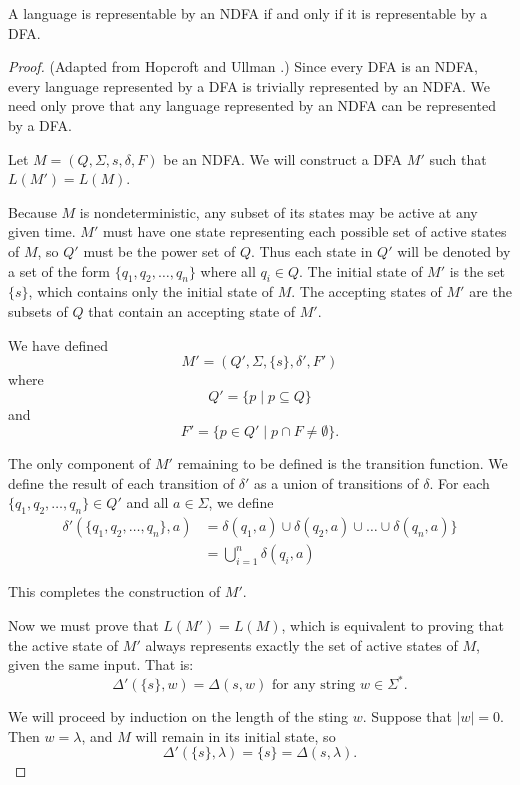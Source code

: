 \documentclass{bcthesis}
\newcommand{\footcite}[2]{\xspace\cite[pg.~{#2}]{#1}\xspace}
\begin{document}
	\begin{claim}
	\label{prop:ndfa_dfa_equivalent}
		A language is representable by an NDFA if and only if it is representable by a DFA.
	\end{claim}
	\begin{proof}
	\label{proof:ndfa_dfa_equivalent}
		(Adapted from Hopcroft and Ullman \footcite{hopcroft}{22}.)
		Since every DFA is an NDFA, every language represented by a DFA is trivially represented by an NDFA.
		We need only prove that any language represented by an NDFA can be represented by a DFA.

		Let $M = (Q, \Sigma, s, \delta, F)$ be an NDFA.
		We will construct a DFA $M'$ such that $L(M') = L(M)$.

		Because $M$ is nondeterministic, any subset of its states may be active at any given time.
		$M'$ must have one state representing each possible set of active states of $M$, so $Q'$ must be the power set of $Q$.
		Thus each state in $Q'$ will be denoted by a set of the form $\{ q_1, q_2, \dots, q_n \}$ where all $q_i \in Q$.
		The initial state of $M'$ is the set $\{ s \}$, which contains only the initial state of $M$.
		The accepting states of $M'$ are the subsets of $Q$ that contain an accepting state of $M'$.

		We have defined
		\[
			M' = (Q', \Sigma, \{s\}, \delta', F')
		\]
		where
		\[
			Q' = \{ p \mid p \subseteq Q \}
		\]
		and
		\[
			F' = \{ p \in Q' \mid p \cap F \neq \emptyset\}.
		\]

		The only component of $M'$ remaining to be defined is the transition function.
		We define the result of each transition of $\delta'$ as a union of transitions of $\delta$.
		For each $\{ q_1, q_2, \dots, q_n \} \in Q'$ and all $a \in \Sigma$, we define
		\begin{align*}
			\delta'(\{ q_1, q_2, \dots, q_n \}, a) &= \delta(q_1, a) \cup \delta(q_2, a) \cup \dots \cup \delta(q_n, a) \} \\
			&= \bigcup_{i=1}^n \delta(q_i, a)
		\end{align*}
		
		This completes the construction of $M'$.

		Now we must prove that $L(M') = L(M)$, which is equivalent to proving that the active state of $M'$ always represents exactly the set of active states of $M$, given the same input.
		That is:
		\[
			\Delta'(\{ s \}, w) = \Delta(s, w) \text{ for any string } w \in \Sigma^*.
		\]
		
		We will proceed by induction on the length of the sting $w$.
		Suppose that $|w| = 0$.
		Then $w = \lambda$, and $M$ will remain in its initial state, so 
		\[
			\Delta'(\{ s \}, \lambda) = \{ s \} = \Delta(s, \lambda).
		\]


\end{proof}
\end{document}
